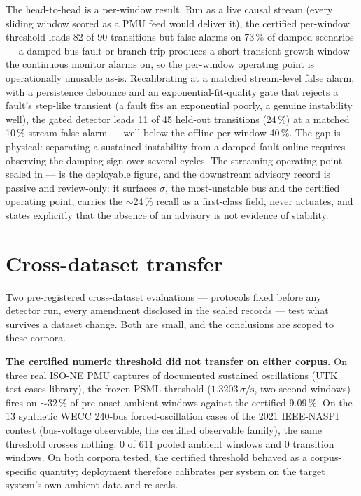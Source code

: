 \documentclass[aip,cha,preprint,amsmath,amssymb]{revtex4-2}
\begin{document}
The head-to-head is a per-window result. Run as a live causal stream
(every sliding window scored as a PMU feed would deliver it), the
certified per-window threshold leads 82 of 90 transitions but
false-alarms on 73\,\% of damped scenarios --- a damped bus-fault or
branch-trip produces a short transient growth window the continuous
monitor alarms on, so the per-window operating point is operationally
unusable as-is. Recalibrating at a matched stream-level false alarm,
with a persistence debounce and an exponential-fit-quality gate that
rejects a fault's step-like transient (a fault fits an exponential
poorly, a genuine instability well), the gated detector leads 11 of 45
held-out transitions (24\,\%) at a matched 10\,\% stream false alarm
--- well below the offline per-window 40\,\%. The gap is physical:
separating a sustained instability from a damped fault online requires
observing the damping sign over several cycles. The streaming operating
point --- sealed in
--- is the deployable figure, and the downstream advisory record is
passive and review-only: it surfaces $\sigma$, the most-unstable bus
and the certified operating point, carries the $\sim$24\,\% recall as a
first-class field, never actuates, and states explicitly that the
absence of an advisory is not evidence of stability.

\section{Cross-dataset transfer}\label{sec:portability}

Two pre-registered cross-dataset evaluations --- protocols fixed before
any detector run, every amendment disclosed in the sealed records ---
test what survives a dataset change. Both are small, and the
conclusions are scoped to these corpora.

\textbf{The certified numeric threshold did not transfer on either
corpus.} On three real ISO-NE PMU captures of documented sustained
oscillations (UTK test-cases library), the frozen PSML threshold
($1.3203\,\sigma/\mathrm{s}$, two-second windows) fires on
$\sim$32\,\% of pre-onset ambient windows against the certified
9.09\,\%. On the 13 synthetic WECC 240-bus forced-oscillation cases of
the 2021 IEEE-NASPI contest (bus-voltage observable, the certified
observable family), the same threshold crosses nothing: 0 of 611 pooled
ambient windows and 0 transition windows. On both corpora tested, the
certified threshold behaved as a corpus-specific quantity; deployment
therefore calibrates per system on the target system's own ambient data
and re-seals.
\end{document}
